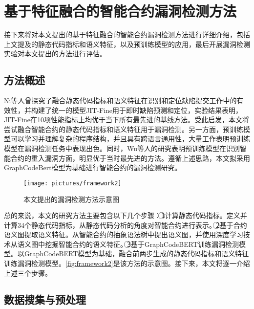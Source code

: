 \chapter{基于特征融合的智能合约漏洞检测方法}
接下来将对本文提出的基于特征融合的智能合约漏洞检测方法进行详细介绍，包括上文提及的静态代码指标和语义特征，以及预训练模型的应用，最后开展漏洞检测实验对本文提出的方法进行评估。
\section{方法概述}
\label{sec:方法概述}
Ni等人\cite{bestofboth}曾探究了融合静态代码指标和语义特征在识别和定位缺陷提交工作中的有效性，并构建了统一的模型JIT-Fine用于即时缺陷预测和定位，实验结果表明，JIT-Fine在10项性能指标上均优于当下所有最先进的基线方法。受此启发，本文将尝试融合智能合约的静态代码指标和语义特征用于漏洞检测。另一方面，预训练模型可以学习并理解复杂的程序结构，并且具有跨语言通用性，大量工作表明预训练模型在漏洞检测任务中表现出色\cite{pretrained_is_good_1,pretrained_is_good_2,pretrained_is_good_3}。同时，Wu等人的研究表明预训练模型在识别智能合约的重入漏洞方面，明显优于当时最先进的方法\cite{wu2021peculiar}。遵循上述思路，本文拟采用GraphCodeBert模型为基础进行智能合约的漏洞检测研究。

\begin{figure}[htbp]
    \centering
    \texttt{[image: pictures/framework2]}
    \caption{\label{fig:framework2}本文提出的漏洞检测方法示意图}
\end{figure}

总的来说，本文的研究方法主要包含以下几个步骤：\textcircled{1}计算静态代码指标。定义并计算34个静态代码指标，从静态代码分析的角度对智能合约进行表示。\textcircled{2}基于合约语义图提取语义特征。从智能合约的抽象语法树中提出语义图，并使用深度学习技术从语义图中挖掘智能合约的语义特征。\textcircled{3}基于GraphCodeBERT训练漏洞检测模型。以GraphCodeBERT模型为基础，融合前两步生成的静态代码指标和语义特征训练漏洞检测模型。\autoref{fig:framework2}是该方法的示意图。接下来，本文将逐一介绍上述三个步骤。


\section{数据搜集与预处理}
\label{sec:数据搜集与预处理}

